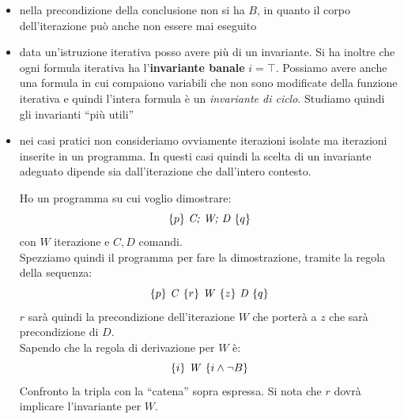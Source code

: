 \documentclass[a4paper,12pt, oneside]{book}
\begin{document}
\begin{definizione}
\begin{itemize}
    \item nella precondizione della conclusione non si ha $B$, in quanto il
    corpo dell'iterazione può anche non essere mai eseguito
    \item data un'istruzione iterativa posso avere più di un invariante. Si ha
    inoltre che ogni formula iterativa ha l'\textbf{invariante banale}
    $i=\top$. Possiamo avere anche una formula in cui compaiono variabili che
    non sono modificate della funzione iterativa e quindi l'intera formula è un
    \textit{invariante di ciclo}. Studiamo quindi gli invarianti ``più utili''
    \item nei casi pratici non consideriamo ovviamente iterazioni isolate ma
    iterazioni inserite in un programma. In questi casi quindi la scelta di un
    invariante adeguato dipende sia dall'iterazione che dall'intero contesto.
    \begin{esempio}
      Ho un programma su cui voglio dimostrare:
      \[\{p\}\mbox{ \textit{C; W; D} }\{q\}\]
      con $W$ iterazione e $C,D$ comandi.\\
      Spezziamo quindi il programma per fare la dimostrazione, tramite la regola
      della sequenza:
      \[\{p\}\mbox{ \textit{C} }\{r\}\mbox{ \textit{W} }\{z\}\mbox{ \textit{D}
        }\{q\}\]
      $r$ sarà quindi la precondizione dell'iterazione $W$ che porterà a $z$ che
      sarà precondizione di $D$.\\
      Sapendo che la regola di derivazione per $W$ è:
      \[\{i\}\mbox{ \textit{W} }\{i\land\neg B\}\]
      Confronto la tripla con la ``catena'' sopra espressa. Si nota che $r$
      dovrà implicare l'invariante per $W$.
    \end{esempio}
  \end{itemize}
\end{definizione}
\end{document}
